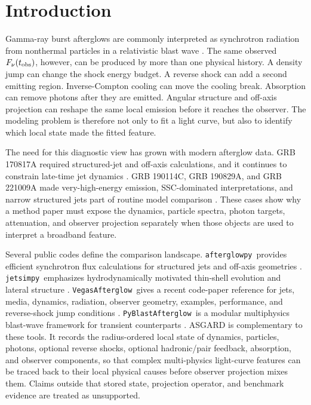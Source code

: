 \documentclass[twocolumn]{aastex702}
\newcommand{\afterglowpy}{\texttt{afterglowpy}}
\newcommand{\jetsimpy}{\texttt{jetsimpy}}
\newcommand{\vegas}{\texttt{VegasAfterglow}}
\newcommand{\pyblast}{\texttt{PyBlastAfterglow}}
\begin{document}
\section{Introduction} \label{sec:intro}

Gamma-ray burst afterglows are commonly interpreted as synchrotron radiation
from nonthermal particles in a relativistic blast wave
\citep{MeszarosRees1997,Sari1998,Granot2002}.  The same observed
\(F_\nu(t_{\rm obs})\), however, can be produced by more than one physical
history.  A density jump can change the shock energy budget.  A reverse shock can
add a second emitting region.  Inverse-Compton cooling can move the cooling break.
Absorption can remove photons after they are emitted.  Angular structure and
off-axis projection can reshape the same local emission before it reaches the
observer.  The modeling problem is therefore not only to fit a light curve, but
also to identify which local state made the fitted feature.

The need for this diagnostic view has grown with modern afterglow data.  GRB
170817A required structured-jet and off-axis calculations, and it continues to
constrain late-time jet dynamics
\citep{Troja2017GW170817Xray,Hallinan2017GW170817Radio,LambKobayashi2017Structured,Mooley2018WideAngle,Mooley2018Superluminal,Lazzati2018CollimatedJet,Margutti2018GW170817,Alexander2018GW170817,Ghirlanda2019StructuredJet,Troja2019GW170817,Hajela2022GW170817,Katira2025GW170817,Ryan2024}.
GRB 190114C, GRB 190829A, and GRB 221009A made very-high-energy emission,
SSC-dominated interpretations, and narrow structured jets part of routine model
comparison
\citep{MAGIC2019TeV,MAGIC2019IC,HESS2019VHE,HESS2021GRB190829A,LHAASO2023TeVAfterglow,LHAASO2023Beyond10TeV,Laskar2023GRB221009A,OConnor2023GRB221009A}.
These cases show why a method paper must expose the dynamics, particle spectra,
photon targets, attenuation, and observer projection separately when those
objects are used to interpret a broadband feature.

Several public codes define the comparison landscape.  \afterglowpy\ provides
efficient synchrotron flux calculations for structured jets and off-axis
geometries \citep{Ryan2020}.  \jetsimpy\ emphasizes hydrodynamically motivated
thin-shell evolution and lateral structure \citep{Wang2024Jetsimpy}.  \vegas\
gives a recent code-paper reference for jets, media, dynamics, radiation,
observer geometry, examples, performance, and reverse-shock jump conditions
\citep{Wang2025VegasAfterglow}.  \pyblast\ is a modular multiphysics blast-wave
framework for transient counterparts \citep{Nedora2025PyBlastAfterglow}.  ASGARD
is complementary to these tools.  It records the radius-ordered local state of
dynamics, particles, photons, optional reverse shocks, optional hadronic/pair
feedback, absorption, and observer components, so that complex multi-physics
light-curve features can be traced back to their local physical causes before
observer projection mixes them.  Claims outside that stored state, projection
operator, and benchmark evidence are treated as unsupported.
\end{document}
